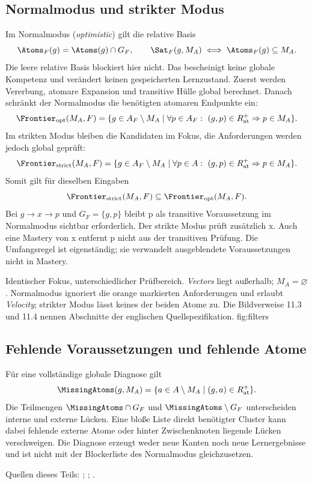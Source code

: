 \subsection{Normalmodus und strikter Modus}
Im Normalmodus (\emph{optimistic}) gilt die relative Basis
\[
 \Atoms_F(g)=\Atoms(g)\cap G_F,\qquad
 \Sat_F(g,M_A)\iff\Atoms_F(g)\subseteq M_A.
\]
Die leere relative Basis blockiert hier nicht. Das bescheinigt keine globale
Kompetenz und verändert keinen gespeicherten Lernzustand. Zuerst werden
Vererbung, atomare Expansion und transitive Hülle global berechnet.
Danach schränkt der Normalmodus die benötigten atomaren Endpunkte ein:
\begin{equation}
 \Frontier_{\mathrm{opt}}(M_A,F)=\{g\in A_F\setminus M_A\mid
 \forall p\in A_F:\ (g,p)\in R_{\mathrm{at}}^+\Rightarrow p\in M_A\}.
\end{equation}
Im strikten Modus bleiben die Kandidaten im Fokus, die Anforderungen
werden jedoch global geprüft:
\begin{equation}
 \Frontier_{\mathrm{strict}}(M_A,F)=
 \{g\in A_F\setminus M_A\mid
 \forall p\in A:\ (g,p)\in R_{\mathrm{at}}^+\Rightarrow p\in M_A\}.
\end{equation}
Somit gilt für dieselben Eingaben
\[
 \Frontier_{\mathrm{strict}}(M_A,F)\subseteq
 \Frontier_{\mathrm{opt}}(M_A,F).
\]
Bei $g\to x\to p$ und $G_F=\{g,p\}$ bleibt p als transitive
Voraussetzung im Normalmodus sichtbar erforderlich. Der strikte Modus
prüft zusätzlich x. Auch eine Mastery von x entfernt p nicht aus
der transitiven Prüfung. Die Umfangsregel ist eigenständig; sie
verwandelt ausgeblendete Voraussetzungen nicht in Mastery.

{Identischer Fokus, unterschiedlicher Prüfbereich. \emph{Vectors} liegt
außerhalb; $M_A=\varnothing$. Normalmodus ignoriert die orange markierten
Anforderungen und erlaubt \emph{Velocity}; strikter Modus lässt keines der
beiden Atome zu. Die Bildverweise 11.3 und 11.4 nennen Abschnitte der
englischen Quellspezifikation.}
{fig:filters}
\FloatBarrier

\subsection{Fehlende Voraussetzungen und fehlende Atome}
Für eine vollständige globale Diagnose gilt
\[
 \MissingAtoms(g,M_A)=\{a\in A\setminus M_A\mid(g,a)\in R_{\mathrm{at}}^+\}.
\]
Die Teilmengen $\MissingAtoms\cap G_F$ und
$\MissingAtoms\setminus G_F$ unterscheiden interne und externe Lücken.
Eine bloße Liste direkt benötigter Cluster kann dabei fehlende externe
Atome oder hinter Zwischenknoten liegende Lücken verschweigen.
Die Diagnose erzeugt weder neue Kanten noch neue Lernergebnisse und
ist nicht mit der Blockerliste des Normalmodus gleichzusetzen.

\noindent\small Quellen dieses Teils:
;
;
.\normalsize
